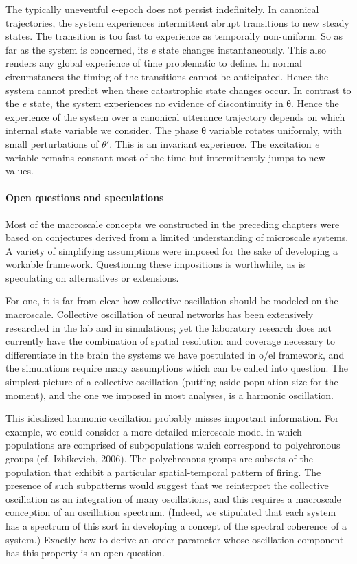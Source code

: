   The typically uneventful e-epoch does not persist indefinitely. In canonical trajectories, the system experiences intermittent abrupt transitions to new steady states. The transition is too fast to experience as temporally non-uniform. So as far as the system is concerned, its \textit{e} state changes instantaneously. This also renders any global experience of time problematic to define. In normal circumstances the timing of the transitions cannot be anticipated. Hence the system cannot predict when these catastrophic state changes occur. In contrast to the \textit{e} state, the system experiences no evidence of discontinuity in θ. Hence the experience of the system over a canonical utterance trajectory depends on which internal state variable we consider. The phase θ variable rotates uniformly, with small perturbations of $\theta ′$. This is an invariant experience. The excitation \textit{e} variable remains constant most of the time but intermittently jumps to new values. 

\paragraph{Open questions and speculations}

Most of the macroscale concepts we constructed in the preceding chapters were based on conjectures derived from a limited understanding of microscale systems. A variety of simplifying assumptions were imposed for the sake of developing a workable framework. Questioning these impositions is worthwhile, as is speculating on alternatives or extensions.

  For one, it is far from clear how collective oscillation should be modeled on the macroscale. Collective oscillation of neural networks has been extensively researched in the lab and in simulations; yet the laboratory research does not currently have the combination of spatial resolution and coverage necessary to differentiate in the brain the systems we have postulated in o/el framework, and the simulations require many assumptions which can be called into question. The simplest picture of a collective oscillation (putting aside population size for the moment), and the one we imposed in most analyses, is a harmonic oscillation.

  This idealized harmonic oscillation probably misses important information. For example, we could consider a more detailed microscale model in which populations are comprised of subpopulations which correspond to polychronous groups (cf. Izhikevich, 2006). The polychronous groups are subsets of the population that exhibit a particular spatial-temporal pattern of firing. The presence of such subpatterns would suggest that we reinterpret the collective oscillation as an integration of many oscillations, and this requires a macroscale conception of an oscillation spectrum. (Indeed, we stipulated that each system has a spectrum of this sort in developing a concept of the spectral coherence of a system.) Exactly how to derive an order parameter whose oscillation component has this property is an open question.


